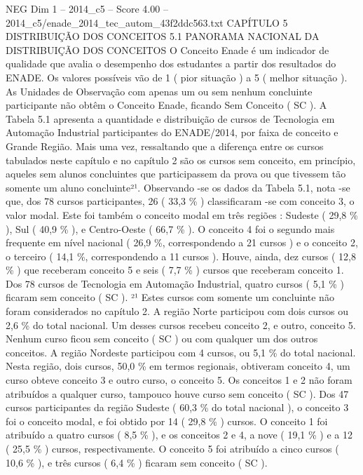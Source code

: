 \begin{textsample}{NEG Dim 1 – 2014\_c5 – Score 4.00 – 2014\_c5/enade\_2014\_tec\_autom\_43f2ddc563.txt}  \label{ex:f1_neg_331}
CAPÍTULO 5 DISTRIBUIÇÃO DOS CONCEITOS 5.1 PANORAMA NACIONAL DA DISTRIBUIÇÃO DOS CONCEITOS O Conceito Enade é um indicador de qualidade que avalia o desempenho dos estudantes a partir dos resultados do ENADE.
Os valores possíveis vão de 1 ( pior situação ) a 5 ( melhor situação ).
As Unidades de Observação com apenas um ou sem nenhum concluinte participante não obtêm o Conceito Enade, ficando Sem Conceito ( SC ).
A Tabela 5.1 apresenta a quantidade e distribuição de cursos de Tecnologia em Automação Industrial participantes do ENADE/2014, por faixa de conceito e Grande Região.
Mais uma vez, ressaltando que a diferença entre os cursos tabulados neste capítulo e no capítulo 2 são os cursos sem conceito, em princípio, aqueles sem alunos concluintes que participassem da prova ou que tivessem tão somente um aluno concluinte²¹.
Observando -se os dados da Tabela 5.1, nota -se que, dos 78 cursos participantes, 26 ( 33,3 \% ) classificaram -se com conceito 3, o valor modal.
Este foi também o conceito modal em três regiões : Sudeste ( 29,8 \% ), Sul ( 40,9 \% ), e Centro-Oeste ( 66,7 \% ).
O conceito 4 foi o segundo mais frequente em nível nacional ( 26,9 \%, correspondendo a 21 cursos ) e o conceito 2, o terceiro ( 14,1 \%, correspondendo a 11 cursos ).
Houve, ainda, dez cursos ( 12,8 \% ) que receberam conceito 5 e seis ( 7,7 \% ) cursos que receberam conceito 1.
Dos 78 cursos de Tecnologia em Automação Industrial, quatro cursos ( 5,1 \% ) ficaram sem conceito ( SC ). ²¹ Estes cursos com somente um concluinte não foram considerados no capítulo 2.
A região Norte participou com dois cursos ou 2,6 \% do total nacional.
Um desses cursos recebeu conceito 2, e outro, conceito 5.
Nenhum curso ficou sem conceito ( SC ) ou com qualquer um dos outros conceitos.
A região Nordeste participou com 4 cursos, ou 5,1 \% do total nacional.
Nesta região, dois cursos, 50,0 \% em termos regionais, obtiveram conceito 4, um curso obteve conceito 3 e outro curso, o conceito 5.
Os conceitos 1 e 2 não foram atribuídos a qualquer curso, tampouco houve curso sem conceito ( SC ).
Dos 47 cursos participantes da região Sudeste ( 60,3 \% do total nacional ), o conceito 3 foi o conceito modal, e foi obtido por 14 ( 29,8 \% ) cursos.
O conceito 1 foi atribuído a quatro cursos ( 8,5 \% ), e os conceitos 2 e 4, a nove ( 19,1 \% ) e a 12 ( 25,5 \% ) cursos, respectivamente.
O conceito 5 foi atribuído a cinco cursos ( 10,6 \% ), e três cursos ( 6,4 \% ) ficaram sem conceito ( SC ).

\end{textsample}
